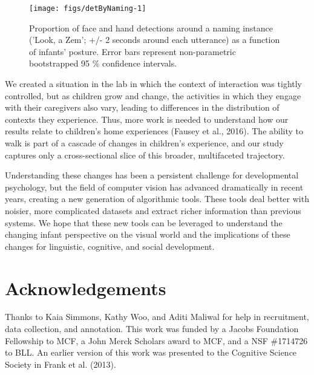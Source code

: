 \documentclass[10pt, letterpaper]{article}
\newenvironment{CodeChunk}{}{}
\begin{document}
\begin{CodeChunk}
\begin{figure}[H]

{\centering \texttt{[image: figs/detByNaming-1]} 

}

\caption[Proportion of face and hand detections around a naming instance ('Look, a Zem']{Proportion of face and hand detections around a naming instance ('Look, a Zem'; +/- 2 seconds around each utterance) as a function of infants' posture. Error bars represent non-parametric bootstrapped 95 \% confidence intervals.}\label{fig:detByNaming}
\end{figure}
\end{CodeChunk}

We created a situation in the lab in which the context of interaction
was tightly controlled, but as children grow and change, the activities
in which they engage with their caregivers also vary, leading to
differences in the distribution of contexts they experience. Thus, more
work is needed to understand how our results relate to children's home
experiences (Fausey et al., 2016). The ability to walk is part of a
cascade of changes in children's experience, and our study captures only
a cross-sectional slice of this broader, multifaceted trajectory.

Understanding these changes has been a persistent challenge for
developmental psychology, but the field of computer vision has advanced
dramatically in recent years, creating a new generation of algorithmic
tools. These tools deal better with noisier, more complicated datasets
and extract richer information than previous systems. We hope that these
new tools can be leveraged to understand the changing infant perspective
on the visual world and the implications of these changes for
linguistic, cognitive, and social development.

\section{Acknowledgements}\label{acknowledgements}

Thanks to Kaia Simmons, Kathy Woo, and Aditi Maliwal for help in
recruitment, data collection, and annotation. This work was funded by a
Jacobs Foundation Fellowship to MCF, a John Merck Scholars award to MCF,
and a NSF \#1714726 to BLL. An earlier version of this work was
presented to the Cognitive Science Society in Frank et al. (2013).

\vspace{1em}
\end{document}
